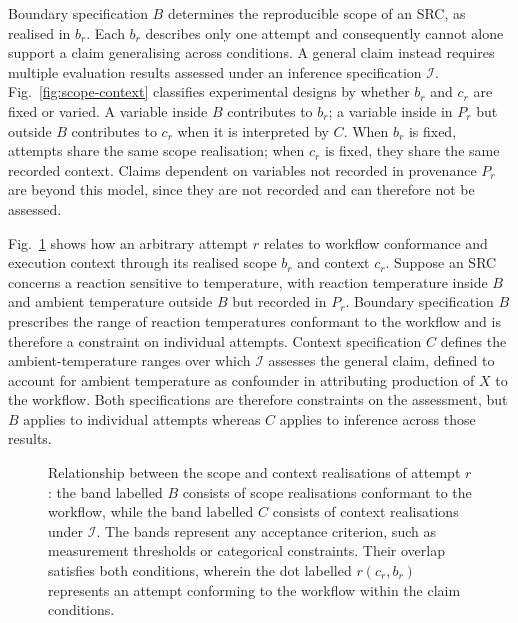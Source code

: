 \documentclass[conference,a4paper]{IEEEtran}
\newlength{\PaperStrokeWidth}
\begin{document}
  Boundary specification $B$ determines the reproducible scope of an SRC, as realised in $b_r$. Each $b_r$ describes only one attempt and consequently cannot alone support a claim generalising across conditions. A general claim instead requires multiple evaluation results assessed under an inference specification $\mathcal I$. Fig.~\ref{fig:scope-context} classifies experimental designs by whether $b_r$ and $c_r$ are fixed or varied. A variable inside $B$ contributes to $b_r$; a variable inside in $P_r$ but outside $B$ contributes to $c_r$ when it is interpreted by $C$. When $b_r$ is fixed, attempts share the same scope realisation; when $c_r$ is fixed, they share the same recorded context. Claims dependent on variables not recorded in provenance $P_r$ are beyond this model, since they are not recorded and can therefore not be assessed. 
  
  Fig.~\ref{fig:claim-classification} shows how an arbitrary attempt $r$ relates to workflow conformance and execution context through its realised scope $b_r$ and context $c_r$. Suppose an SRC concerns a reaction sensitive to temperature, with reaction temperature inside $B$ and ambient temperature outside $B$ but recorded in $P_r$. Boundary specification $B$ prescribes the range of reaction temperatures conformant to the workflow and is therefore a constraint on individual attempts. Context specification $C$ defines the ambient-temperature ranges over which $\mathcal I$ assesses the general claim, defined to account for ambient temperature as confounder in attributing production of $X$ to the workflow. Both specifications are therefore constraints on the assessment, but $B$ applies to individual attempts whereas $C$ applies to inference across those results.

  \begin{figure}[!t]
    \centering
    \ClaimClassificationDiagram{\PaperStrokeWidth}
    \caption{Relationship between the scope and context realisations of attempt $r$: the band labelled $B$ consists of scope realisations conformant to the workflow, while the band labelled $C$ consists of context realisations under $\mathcal I$. The bands represent any acceptance criterion, such as measurement thresholds or categorical constraints. Their overlap satisfies both conditions, wherein the dot labelled $r(c_r,b_r)$ represents an attempt conforming to the workflow within the claim conditions.}
    \label{fig:claim-classification}
  \end{figure}
\end{document}
